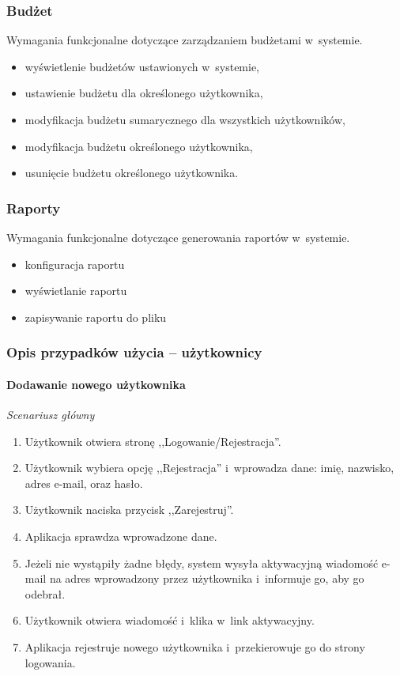 \subsubsection{Budżet}
Wymagania funkcjonalne dotyczące zarządzaniem budżetami w~systemie.
\begin{itemize}
  \item wyświetlenie budżetów ustawionych w~systemie,
  \item ustawienie budżetu dla określonego użytkownika,
  \item modyfikacja budżetu sumarycznego dla wszystkich użytkowników,
  \item modyfikacja budżetu określonego użytkownika,
  \item usunięcie budżetu określonego użytkownika.
\end{itemize}

\subsubsection{Raporty}
Wymagania funkcjonalne dotyczące generowania raportów w~systemie.
\begin{itemize}
  \item konfiguracja raportu
  \item wyświetlanie raportu
  \item zapisywanie raportu do pliku
\end{itemize}

\subsubsection{Opis przypadków użycia -- użytkownicy}

\paragraph{Dodawanie nowego użytkownika\newline}
\label{par:register}

\textit{Scenariusz główny}

\begin{enumerate}
\item Użytkownik otwiera stronę ,,Logowanie/Rejestracja''.
\item Użytkownik wybiera opcję ,,Rejestracja'' i~wprowadza dane: imię, nazwisko, adres e-mail, oraz hasło.
\item Użytkownik naciska przycisk ,,Zarejestruj''.
\item Aplikacja sprawdza wprowadzone dane.
\item Jeżeli nie wystąpiły żadne błędy, system wysyła aktywacyjną wiadomość e-mail na adres wprowadzony przez
użytkownika i~informuje go, aby go odebrał.
\item Użytkownik otwiera wiadomość i~klika w~link aktywacyjny.
\item Aplikacja rejestruje nowego użytkownika i~przekierowuje go do strony logowania.
\end{enumerate}

